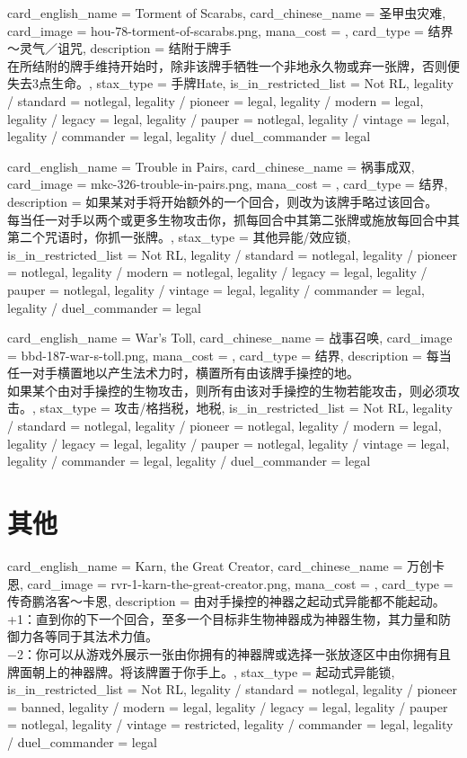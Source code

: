 \documentclass[lang = cn, color = black, 10pt]{AllThatStax}
\begin{document}
\card
{
	card_english_name = {Torment of Scarabs},
	card_chinese_name = {圣甲虫灾难},
	card_image = hou-78-torment-of-scarabs.png,
	mana_cost = ,
	card_type = 结界～灵气／诅咒,
	description = {结附于牌手\\
在所结附的牌手维持开始时，除非该牌手牺牲一个非地永久物或弃一张牌，否则便失去3点生命。},
	stax_type = 手牌Hate,
	is_in_restricted_list = Not RL,
	legality / standard = notlegal,
	legality / pioneer = legal,
	legality / modern = legal,
	legality / legacy = legal,
	legality / pauper = notlegal,
	legality / vintage = legal,
	legality / commander = legal,
	legality / duel_commander = legal
}

\card
{
	card_english_name = {Trouble in Pairs},
	card_chinese_name = {祸事成双},
	card_image = mkc-326-trouble-in-pairs.png,
	mana_cost = ,
	card_type = 结界,
	description = {如果某对手将开始额外的一个回合，则改为该牌手略过该回合。\\
每当任一对手以两个或更多生物攻击你，抓每回合中其第二张牌或施放每回合中其第二个咒语时，你抓一张牌。},
	stax_type = 其他异能/效应锁,
	is_in_restricted_list = Not RL,
	legality / standard = notlegal,
	legality / pioneer = notlegal,
	legality / modern = notlegal,
	legality / legacy = legal,
	legality / pauper = notlegal,
	legality / vintage = legal,
	legality / commander = legal,
	legality / duel_commander = legal
}

\card
{
	card_english_name = {War's Toll},
	card_chinese_name = {战事召唤},
	card_image = bbd-187-war-s-toll.png,
	mana_cost = ,
	card_type = 结界,
	description = {每当任一对手横置地以产生法术力时，横置所有由该牌手操控的地。\\
如果某个由对手操控的生物攻击，则所有由该对手操控的生物若能攻击，则必须攻击。},
	stax_type = 攻击/格挡税，地税,
	is_in_restricted_list = Not RL,
	legality / standard = notlegal,
	legality / pioneer = notlegal,
	legality / modern = legal,
	legality / legacy = legal,
	legality / pauper = notlegal,
	legality / vintage = legal,
	legality / commander = legal,
	legality / duel_commander = legal
}

\section{其他}

\card
{
	card_english_name = {Karn, the Great Creator},
	card_chinese_name = {万创卡恩},
	card_image = rvr-1-karn-the-great-creator.png,
	mana_cost = ,
	card_type = 传奇鹏洛客～卡恩,
	description = {由对手操控的神器之起动式异能都不能起动。\\
+1：直到你的下一个回合，至多一个目标非生物神器成为神器生物，其力量和防御力各等同于其法术力值。\\
−2：你可以从游戏外展示一张由你拥有的神器牌或选择一张放逐区中由你拥有且牌面朝上的神器牌。将该牌置于你手上。},
	stax_type = 起动式异能锁,
	is_in_restricted_list = Not RL,
	legality / standard = notlegal,
	legality / pioneer = banned,
	legality / modern = legal,
	legality / legacy = legal,
	legality / pauper = notlegal,
	legality / vintage = restricted,
	legality / commander = legal,
	legality / duel_commander = legal
}
\end{document}
